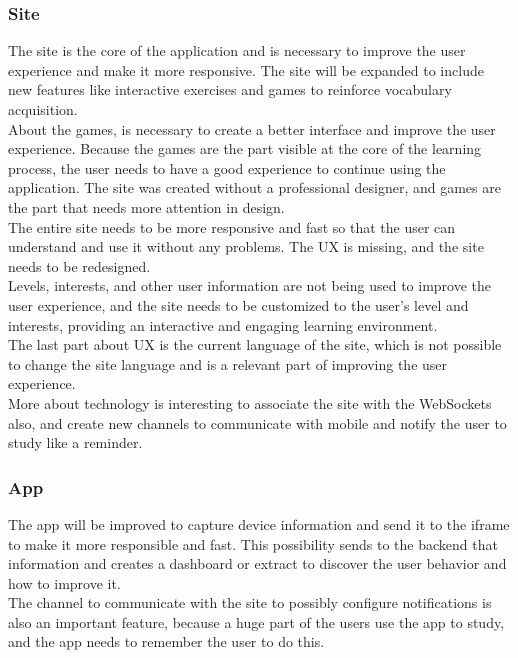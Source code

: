 \documentclass[12pt]{article}
\begin{document}
\subsubsection{Site}
The site is the core of the application and is necessary to improve the user experience and make it more responsive. The site will be expanded to include new features like interactive exercises and games to reinforce vocabulary acquisition. \\
About the games, is necessary to create a better interface and improve the user experience. Because the games are the part visible at the core of the learning process, the user needs to have a good experience to continue using the application. The site was created without a professional designer, and games are the part that needs more attention in design. \\
The entire site needs to be more responsive and fast so that the user can understand and use it without any problems. The UX is missing, and the site needs to be redesigned. \\
Levels, interests, and other user information are not being used to improve the user experience, and the site needs to be customized to the user's level and interests, providing an interactive and engaging learning environment. \\
The last part about UX is the current language of the site, which is not possible to change the site language and is a relevant part of improving the user experience. \\
More about technology is interesting to associate the site with the WebSockets also, and create new channels to communicate with mobile and notify the user to study like a reminder. 
\subsubsection{App}
The app will be improved to capture device information and send it to the iframe to make it more responsible and fast. This possibility sends to the backend that information and creates a dashboard or extract to discover the user behavior and how to improve it. \\
The channel to communicate with the site to possibly configure notifications is also an important feature, because a huge part of the users use the app to study, and the app needs to remember the user to do this. 
\end{document}
